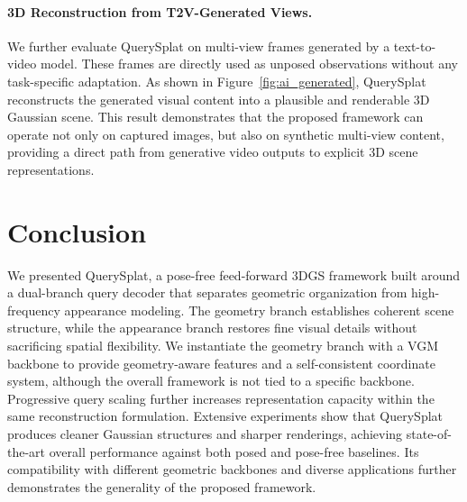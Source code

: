 \documentclass[letterpaper]{article} %
\begin{document}
\paragraph{3D Reconstruction from T2V-Generated Views.}
We further evaluate QuerySplat on multi-view frames generated by a text-to-video model. These frames are directly used as unposed observations without any task-specific adaptation. As shown in Figure~\ref{fig:ai_generated}, QuerySplat reconstructs the generated visual content into a plausible and renderable 3D Gaussian scene. This result demonstrates that the proposed framework can operate not only on captured images, but also on synthetic multi-view content, providing a direct path from generative video outputs to explicit 3D scene representations.








\section{Conclusion}

We presented QuerySplat, a pose-free feed-forward 3DGS framework built around a dual-branch query decoder that separates geometric organization from high-frequency appearance modeling. The geometry branch establishes coherent scene structure, while the appearance branch restores fine visual details without sacrificing spatial flexibility. We instantiate the geometry branch with a VGM backbone to provide geometry-aware features and a self-consistent coordinate system, although the overall framework is not tied to a specific backbone. Progressive query scaling further increases representation capacity within the same reconstruction formulation. Extensive experiments show that QuerySplat produces cleaner Gaussian structures and sharper renderings, achieving state-of-the-art overall performance against both posed and pose-free baselines. Its compatibility with different geometric backbones and diverse applications further demonstrates the generality of the proposed framework.
\end{document}
